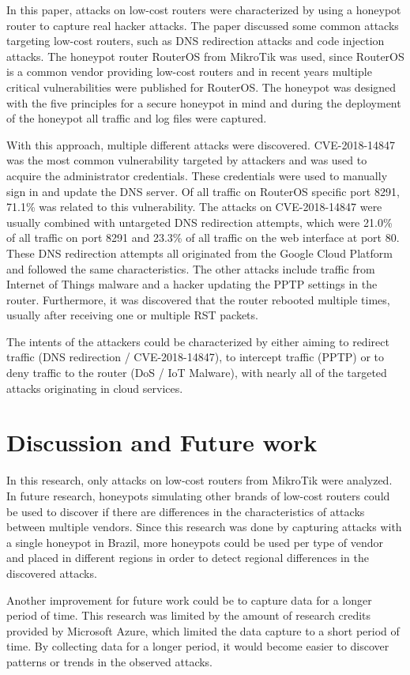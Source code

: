 In this paper, attacks on low-cost routers were characterized by using a honeypot router to capture real hacker attacks. The paper discussed some common attacks targeting low-cost routers, such as DNS redirection attacks and code injection attacks. The honeypot router RouterOS from MikroTik was used, since RouterOS is a common vendor providing low-cost routers and in recent years multiple critical vulnerabilities were published for RouterOS. The honeypot was designed with the five principles for a secure honeypot in mind \cite{HONEYPOTSLIABILITY:SPRINGER:2015} and during the deployment of the honeypot all traffic and log files were captured.

With this approach, multiple different attacks were discovered. CVE-2018-14847 was the most common vulnerability targeted by attackers and was used to acquire the administrator credentials. These credentials were used to manually sign in and update the DNS server. Of all traffic on RouterOS specific port 8291, 71.1\% was related to this vulnerability. The attacks on CVE-2018-14847 were usually combined with untargeted DNS redirection attempts, which were 21.0\% of all traffic on port 8291 and 23.3\% of all traffic on the web interface at port 80. These DNS redirection attempts all originated from the Google Cloud Platform and followed the same characteristics. The other attacks include traffic from Internet of Things malware and a hacker updating the PPTP settings in the router. Furthermore, it was discovered that the router rebooted multiple times, usually after receiving one or multiple RST packets. 

The intents of the attackers could be characterized by either aiming to redirect traffic (DNS redirection / CVE-2018-14847), to intercept traffic (PPTP) or to deny traffic to the router (DoS / IoT Malware), with nearly all of the targeted attacks originating in cloud services.

\section{Discussion and Future work}
In this research, only attacks on low-cost routers from MikroTik were analyzed. In future research, honeypots simulating other brands of low-cost routers could be used to discover if there are differences in the characteristics of attacks between multiple vendors. Since this research was done by capturing attacks with a single honeypot in Brazil, more honeypots could be used per type of vendor and placed in different regions in order to detect regional differences in the discovered attacks.

Another improvement for future work could be to capture data for a longer period of time. This research was limited by the amount of research credits provided by Microsoft Azure, which limited the data capture to a short period of time. By collecting data for a longer period, it would become easier to discover patterns or trends in the observed attacks.